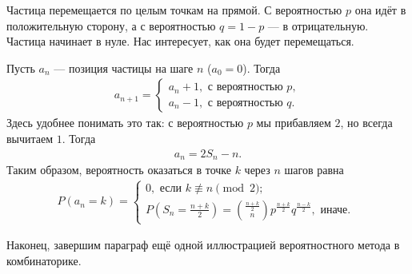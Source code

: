 \documentclass[../main.tex]{subfiles}
\begin{document}
\begin{exmpl}
 Частица перемещается по целым точкам на прямой. С вероятностью $p$ она идёт в положительную сторону, а с вероятностью $q = 1 - p$ --- в отрицательную. Частица начинает в нуле. Нас интересует, как она будет перемещаться.

 Пусть $a_n$ --- позиция частицы на шаге $n$ ($a_0 = 0$). Тогда
 \begin{align*}
  a_{n+1} = \begin{cases}
   a_n + 1, \text{ с вероятностью } p,  \\
   a_n - 1, \text{ с вероятностью } q.
  \end{cases}
 \end{align*} Здесь удобнее понимать это так: с вероятностью $p$ мы прибавляем $2$, но всегда вычитаем $1$. Тогда
 \begin{align*}
  a_n = 2S_n - n.
 \end{align*} Таким образом, вероятность оказаться в точке $k$ через $n$ шагов равна
 \begin{align*}
  P(a_n = k) = \begin{cases}
   0, \text{ если } k \not \equiv n \pmod 2;  \\
   P(S_n = \frac{n+k}{2}) = \binom {\frac{n+k}{2}} n p^{\frac{n+k}{2}} q^{\frac{n-k}{2}}, \text{ иначе. }
  \end{cases} 
 \end{align*} 
\end{exmpl}

Наконец, завершим параграф ещё одной иллюстрацией вероятностного метода в комбинаторике.
\end{document}
